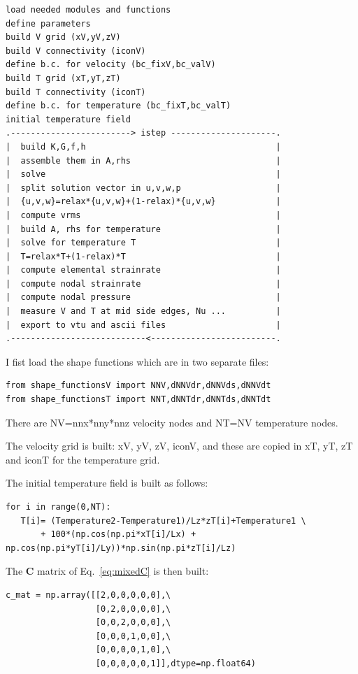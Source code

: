 \begin{verbatim}
load needed modules and functions
define parameters
build V grid (xV,yV,zV)
build V connectivity (iconV)
define b.c. for velocity (bc_fixV,bc_valV)
build T grid (xT,yT,zT)
build T connectivity (iconT)
define b.c. for temperature (bc_fixT,bc_valT)
initial temperature field
.------------------------> istep ---------------------.
|  build K,G,f,h                                      |
|  assemble them in A,rhs                             |
|  solve                                              |
|  split solution vector in u,v,w,p                   |
|  {u,v,w}=relax*{u,v,w}+(1-relax)*{u,v,w}            |
|  compute vrms                                       |
|  build A, rhs for temperature                       |
|  solve for temperature T                            |
|  T=relax*T+(1-relax)*T                              |
|  compute elemental strainrate                       |
|  compute nodal strainrate                           |
|  compute nodal pressure                             |
|  measure V and T at mid side edges, Nu ...          |
|  export to vtu and ascii files                      | 
.---------------------------<-------------------------.
\end{verbatim}

I fist load the shape functions which are in two separate files:

\begin{lstlisting}
from shape_functionsV import NNV,dNNVdr,dNNVds,dNNVdt
from shape_functionsT import NNT,dNNTdr,dNNTds,dNNTdt
\end{lstlisting}

There are NV=nnx*nny*nnz velocity nodes and NT=NV temperature nodes.

The velocity grid is built: xV, yV, zV, iconV, and 
these are copied in xT, yT, zT and iconT for the temperature grid.  

The initial temperature field is built as follows:
\begin{lstlisting}
for i in range(0,NT):
   T[i]= (Temperature2-Temperature1)/Lz*zT[i]+Temperature1 \
       + 100*(np.cos(np.pi*xT[i]/Lx) + np.cos(np.pi*yT[i]/Ly))*np.sin(np.pi*zT[i]/Lz)
\end{lstlisting}

The ${\bm C}$ matrix of Eq.~\ref{eq:mixedC} is then built:
\begin{lstlisting}
c_mat = np.array([[2,0,0,0,0,0],\
                  [0,2,0,0,0,0],\
                  [0,0,2,0,0,0],\
                  [0,0,0,1,0,0],\
                  [0,0,0,0,1,0],\
                  [0,0,0,0,0,1]],dtype=np.float64) 
\end{lstlisting}



